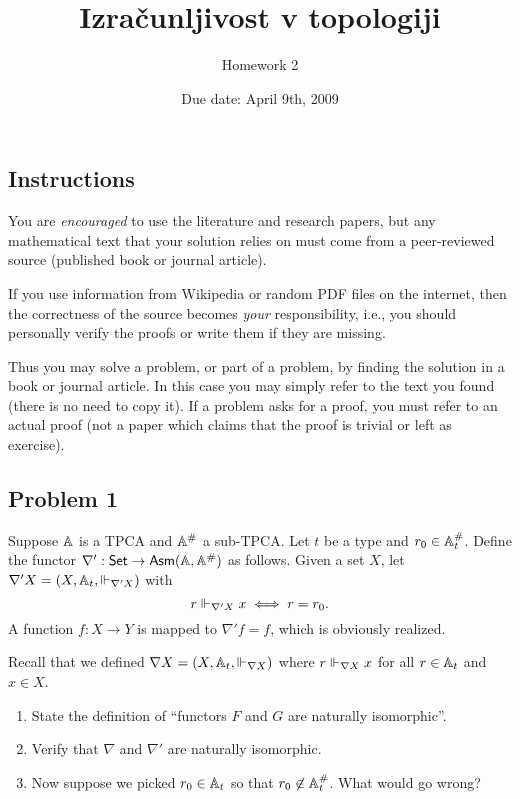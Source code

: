 \documentclass[a4paper,11pt]{article}
\begin{document}
\title{Izračunljivost v topologiji}
\author{Homework 2}
\date{Due date: April 9th, 2009}

\maketitle

\subsection*{Instructions}

You are \emph{encouraged} to use the literature and research papers,
but any mathematical text that your solution relies on must come from
a peer-reviewed source (published book or journal article).

If you use information from Wikipedia or random PDF files on the
internet, then the correctness of the source becomes \emph{your}
responsibility, i.e., you should personally verify the proofs or write
them if they are missing.

Thus you may solve a problem, or part of a problem, by finding the
solution in a book or journal article. In this case you may simply
refer to the text you found (there is no need to copy it). If a
problem asks for a proof, you must refer to an actual proof (not a
paper which claims that the proof is trivial or left as exercise).

\subsection*{Problem 1}

Suppose $\AA$ is a TPCA and $\compAA$ a sub-TPCA. Let $t$ be a type
and $r_0 \in \compAtyp{t}$. Define the functor $\nabla' : \Set \to
\AsmA$ as follows. Given a set $X$, let $\nabla' X = (X, \Atyp{t},
{\rz_{\nabla' X}})$ with
%
\begin{equation*}
  r \rz_{\nabla' X} x \iff r = r_0.
\end{equation*}
%
A function $f : X \to Y$ is mapped to $\nabla' f = f$, which is
obviously realized.

Recall that we defined $\nabla X = (X, \Atyp{t}, {\rz_{\nabla X}})$
where $r \rz_{\nabla X} x$ for all $r \in \Atyp{t}$ and $x \in X$.

\begin{enumerate}
\item State the definition of ``functors $F$ and $G$ are naturally
  isomorphic''.
\item Verify that $\nabla$ and $\nabla'$ are naturally isomorphic.
\item Now suppose we picked $r_0 \in \Atyp{t}$ so that $r_0 \not\in
  \compAtyp{t}$. What would go wrong?
\end{enumerate}
\end{document}
